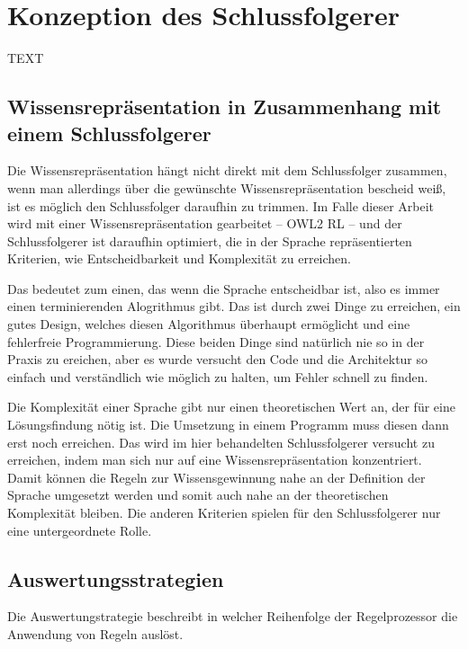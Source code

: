 \chapter{Konzeption des Schlussfolgerer}

TEXT



\section{Wissensrepräsentation in Zusammenhang mit einem Schlussfolgerer}

Die Wissensrepräsentation hängt nicht direkt mit dem Schlussfolger zusammen, wenn man allerdings über die gewünschte Wissensrepräsentation bescheid weiß, ist es möglich den Schlussfolger daraufhin zu trimmen. Im Falle dieser Arbeit wird mit einer Wissensrepräsentation gearbeitet -- OWL2 RL -- und der Schlussfolgerer ist daraufhin optimiert, die in der Sprache repräsentierten Kriterien, wie Entscheidbarkeit und Komplexität zu erreichen.

Das bedeutet zum einen, das wenn die Sprache entscheidbar ist, also es immer einen terminierenden Alogrithmus gibt. Das ist durch zwei Dinge zu erreichen, ein gutes Design, welches diesen Algorithmus überhaupt ermöglicht und eine fehlerfreie Programmierung. Diese beiden Dinge sind natürlich nie so in der Praxis zu ereichen, aber es wurde versucht den Code und die Architektur so einfach und verständlich wie möglich zu halten, um Fehler schnell zu finden.

Die Komplexität einer Sprache gibt nur einen theoretischen Wert an, der für eine Lösungsfindung nötig ist. Die Umsetzung in einem Programm muss diesen dann erst noch erreichen. Das wird im hier behandelten Schlussfolgerer versucht zu erreichen, indem man sich nur auf eine Wissensrepräsentation konzentriert. Damit können die Regeln zur Wissensgewinnung nahe an der Definition der Sprache umgesetzt werden und somit auch nahe an der theoretischen Komplexität bleiben.
Die anderen Kriterien spielen für den Schlussfolgerer nur eine untergeordnete Rolle.





\section{Auswertungsstrategien}
Die Auswertungstrategie beschreibt in welcher Reihenfolge der Regelprozessor die Anwendung von Regeln auslöst. 

